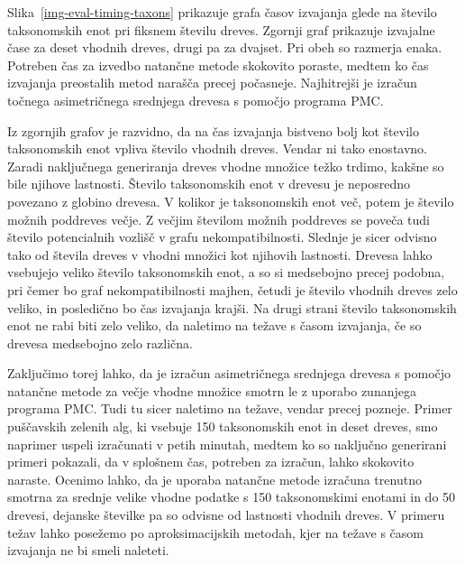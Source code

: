 \documentclass[a4paper, 12pt]{book}
\begin{document}
Slika~\ref{img-eval-timing-taxons} prikazuje grafa časov izvajanja glede na število 
taksonomskih enot pri fiksnem številu dreves. Zgornji graf  prikazuje izvajalne čase
za deset vhodnih dreves, drugi pa za dvajset. Pri obeh so razmerja enaka. Potreben čas
za izvedbo natančne metode skokovito poraste, medtem ko čas izvajanja preostalih 
metod narašča precej počasneje. Najhitrejši je izračun točnega asimetričnega srednjega 
drevesa s pomočjo programa PMC.

Iz zgornjih grafov je razvidno, da na čas izvajanja bistveno bolj kot število taksonomskih
enot vpliva število vhodnih dreves. Vendar ni tako enostavno. Zaradi naključnega generiranja 
dreves vhodne množice težko trdimo, kakšne so bile njihove lastnosti.  Število 
taksonomskih enot v drevesu je neposredno povezano z globino drevesa. V kolikor
je taksonomskih enot več, potem je število možnih poddreves večje. Z večjim številom
možnih poddreves se poveča tudi število potencialnih vozlišč v grafu nekompatibilnosti.
Slednje je sicer odvisno tako od števila dreves v vhodni množici kot njihovih lastnosti.
Drevesa lahko vsebujejo veliko število taksonomskih enot, a so si medsebojno precej
podobna, pri čemer bo graf nekompatibilnosti majhen, četudi je število vhodnih dreves 
zelo veliko, in posledično bo čas izvajanja krajši. Na drugi strani število taksonomskih 
enot ne rabi biti zelo veliko, da naletimo na težave s časom izvajanja, če so drevesa 
medsebojno zelo različna.

Zaključimo torej lahko, da je izračun asimetričnega srednjega drevesa s pomočjo natančne
metode za večje vhodne množice smotrn le z uporabo
zunanjega programa PMC. Tudi tu sicer naletimo na težave, vendar precej pozneje. Primer 
puščavskih zelenih alg, ki vsebuje 150 taksonomskih enot in deset dreves, smo naprimer 
uspeli izračunati v petih minutah, medtem ko so naključno generirani primeri 
pokazali, da v splošnem čas, potreben za izračun, lahko skokovito naraste. Ocenimo
lahko, da je uporaba natančne metode izračuna trenutno smotrna za srednje velike 
vhodne podatke s 150 taksonomskimi enotami in do 50 drevesi, dejanske številke pa so odvisne od
lastnosti vhodnih dreves. V primeru težav lahko posežemo po aproksimacijskih metodah, 
kjer na težave s časom izvajanja ne bi smeli naleteti.
\end{document}
